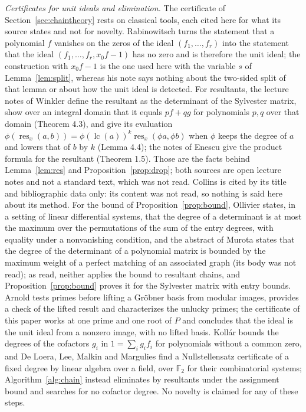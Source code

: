\documentclass[11pt]{article}
\theoremstyle{remark}
\begin{document}
\emph{Certificates for unit ideals and elimination.} The certificate of Section~\ref{sec:chaintheory} rests on classical tools, each cited here for what its source states and not for novelty. Rabinowitsch \cite{Rabinowitsch1930} turns the statement that a polynomial $f$ vanishes on the zeros of the ideal $(f_1,\dots,f_r)$ into the statement that the ideal $(f_1,\dots,f_r,x_0f-1)$ has no zero and is therefore the unit ideal; the construction with $x_0f-1$ is the one used here with the variable $s$ of Lemma~\ref{lem:split}, whereas his note says nothing about the two-sided split of that lemma or about how the unit ideal is detected. For resultants, the lecture notes of Winkler \cite{Winkler2012} define the resultant as the determinant of the Sylvester matrix, show over an integral domain that it equals $pf+qg$ for polynomials $p,q$ over that domain (Theorem 4.3), and give its evaluation $\phi(\operatorname{res}_x(a,b))=\phi(\operatorname{lc}(a))^k\operatorname{res}_x(\phi a,\phi b)$ when $\phi$ keeps the degree of $a$ and lowers that of $b$ by $k$ (Lemma 4.4); the notes of Enescu \cite{Enescu2010} give the product formula for the resultant (Theorem 1.5). Those are the facts behind Lemma~\ref{lem:res} and Proposition~\ref{prop:drop}; both sources are open lecture notes and not a standard text, which was not read. Collins \cite{Collins1971} is cited by its title and bibliographic data only: its content was not read, so nothing is said here about its method. For the bound of Proposition~\ref{prop:bound}, Ollivier \cite{Ollivier2010} states, in a setting of linear differential systems, that the degree of a determinant is at most the maximum over the permutations of the sum of the entry degrees, with equality under a nonvanishing condition, and the abstract of Murota \cite{Murota1995} states that the degree of the determinant of a polynomial matrix is bounded by the maximum weight of a perfect matching of an associated graph (its body was not read); as read, neither applies the bound to resultant chains, and Proposition~\ref{prop:bound} proves it for the Sylvester matrix with entry bounds. Arnold \cite{Arnold2003} tests primes before lifting a Gr\"obner basis from modular images, provides a check of the lifted result and characterizes the unlucky primes; the certificate of this paper works at one prime and one root of $P$ and concludes that the ideal is the unit ideal from a nonzero image, with no lifted basis. Koll\'ar \cite{Kollar1988} bounds the degrees of the cofactors $g_i$ in $1=\sum_ig_if_i$ for polynomials without a common zero, and De Loera, Lee, Malkin and Margulies \cite{DeLoera2008} find a Nullstellensatz certificate of a fixed degree by linear algebra over a field, over $\mathbb F_2$ for their combinatorial systems; Algorithm~\ref{alg:chain} instead eliminates by resultants under the assignment bound and searches for no cofactor degree. No novelty is claimed for any of these steps.
\end{document}
